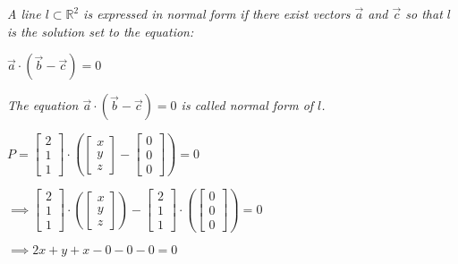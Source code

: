 \documentclass{article}
\begin{document}
{\begin{center}
\textit{A line $l \subset \mathbb{R}^2$ is expressed in normal form if there exist vectors $\vec{a}$ and $\vec{c}$ so that $l$ is the solution set to the equation:}

	$\vec{a} \cdot{(\vec{b} - \vec{c})} = 0
	$
	
\textit{The equation $\vec{a} \cdot{(\vec{b} - \vec{c})} = 0$ is called normal form of $l$.} 
	
\end{center}

\begin{center}
	$ P =
\begin{bmatrix} 2 \\ 1 \\ 1 \end{bmatrix} \cdot
\left(
\begin{bmatrix} x \\ y \\ z \end{bmatrix} -
\begin{bmatrix} 0 \\ 0 \\ 0 \end{bmatrix}
\right) = 0
$

\end{center}

\begin{center}
$ \implies
\begin{bmatrix} 2 \\ 1 \\ 1 \end{bmatrix} \cdot
\left(
\begin{bmatrix} x \\ y \\ z \end{bmatrix}\right)
-
\begin{bmatrix} 2 \\ 1 \\ 1 \end{bmatrix} \cdot
\left(
\begin{bmatrix} 0 \\ 0 \\ 0 \end{bmatrix}
\right) = 0
$

$\implies 2x + y + x - 0 - 0 - 0 = 0
$


\end{center}}
\end{document}
